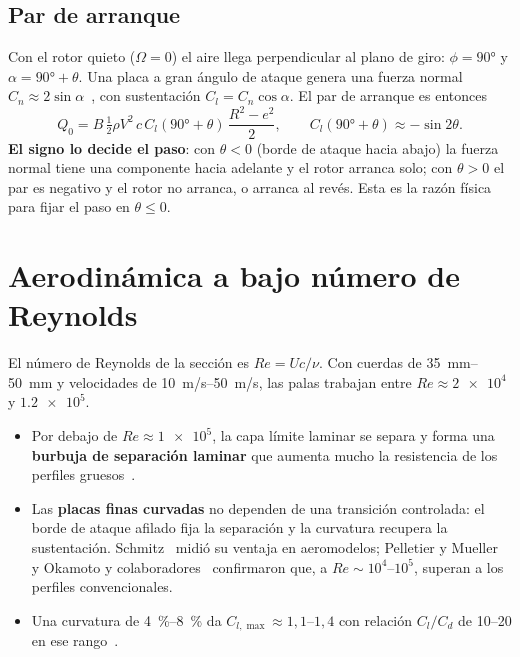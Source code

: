 \subsection{Par de arranque}\label{sec:arranque-teoria}
Con el rotor quieto ($\Omega=0$) el aire llega perpendicular al plano de giro:
$\phi=\ang{90}$ y $\alpha=\ang{90}+\theta$. Una placa a gran ángulo de ataque genera una
fuerza normal $C_n\approx2\sin\alpha$~\cite{hoerner1965}, con sustentación
$C_l=C_n\cos\alpha$. El par de arranque es entonces
\begin{equation}
  Q_0 = B\,\tfrac12\rho V^2\,c\,C_l(\ang{90}+\theta)\,\frac{R^2-e^2}{2},
  \qquad C_l(\ang{90}+\theta)\approx -\sin 2\theta .
  \label{eq:Q0}
\end{equation}
\textbf{El signo lo decide el paso}: con $\theta<0$ (borde de ataque hacia abajo) la
fuerza normal tiene una componente hacia adelante y el rotor arranca solo; con
$\theta>0$ el par es negativo y el rotor no arranca, o arranca al revés. Esta es la razón
física para fijar el paso en $\theta\le0$.

\section{Aerodinámica a bajo número de Reynolds}\label{sec:lowre}
El número de Reynolds de la sección es $Re=U c/\nu$. Con cuerdas de
\SIrange{35}{50}{mm} y velocidades de \SIrange{10}{50}{m/s}, las palas trabajan entre
$Re\approx\num{2e4}$ y $\num{1.2e5}$.

\begin{itemize}
  \item Por debajo de $Re\approx\num{1e5}$, la capa límite laminar se separa y forma una
        \textbf{burbuja de separación laminar} que aumenta mucho la resistencia de los
        perfiles gruesos~\cite{lissaman1983,mueller2003}.
  \item Las \textbf{placas finas curvadas} no dependen de una transición controlada: el
        borde de ataque afilado fija la separación y la curvatura recupera la
        sustentación. Schmitz~\cite{schmitz1942} midió su ventaja en aeromodelos;
        Pelletier y Mueller~\cite{pelletier2000} y Okamoto y colaboradores~\cite{okamoto1996}
        confirmaron que, a $Re\sim10^4$--$10^5$, superan a los perfiles convencionales.
  \item Una curvatura de \SIrange{4}{8}{\percent} da $C_{l,\max}\approx1{,}1$--$1{,}4$ con
        relación $C_l/C_d$ de 10--20 en ese rango~\cite{pelletier2000,mueller2003,selig1995}.
\end{itemize}

